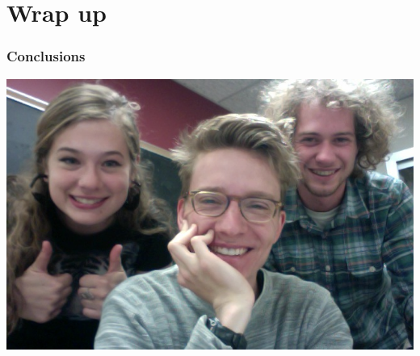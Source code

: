 \documentclass[mathserif,serif]{beamer}
\begin{document}
\section{Wrap up}

\begin{frame}

	\frametitle{Conclusions}
	
	\includegraphics[width=\textwidth]{us}
	
\end{frame}
\end{document}
